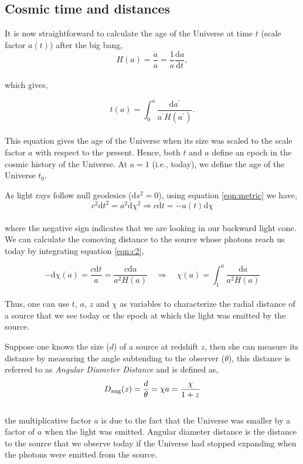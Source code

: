\documentclass[
  11pt,
  twoside,
  openright,
  titlepage,
  headings=optiontoheadandtoc
]{scrbook}
\begin{document}
\subsection{Cosmic time and distances}


It is now straightforward to calculate the age of the Universe at time $t$ 
(scale factor $a(t)$) after the big bang,
\begin{equation}
	H(a) = \dfrac{\dot{a}}{a} = \dfrac{1}{a} \dfrac{\mathrm{d}a}{\mathrm{d}t},
\end{equation}
\\
which gives,

\begin{equation}
	t(a) = \int_0^a \dfrac{\mathrm{d}a^{\prime}}{a^{\prime}H(a^{\prime})}.
\end{equation}
\\
This equation gives the age of the Universe when its size was
scaled to the scale factor $a$ with respect to the present. Hence, both $t$ and
$a$ define an epoch in the cosmic history of the Universe. At $a=1$ (i.e., today),
we define the age of the Universe $t_0$.

As light rays follow null geodesics ($\mathrm{d}s^2=0$), using equation 
\ref{eqn:metric} we have,
\begin{equation}
	c^2\mathrm{d}t^2 = a^2\mathrm{d}\chi^2 \Rightarrow c\mathrm{d}t = -a(t)\mathrm{d}\chi
	\label{eqn:c2}
\end{equation}
\\
where the negative sign indicates that we are looking in our backward light cone. 
We can calculate the comoving distance to the source whose photons reach us
today by integrating equation \ref{eqn:c2},

\begin{equation}
	-\mathrm{d}\chi(a) = \dfrac{c\mathrm{d}t}{a} = 
	 \dfrac{c\mathrm{d}a}{a^2 H(a)} \quad
	 \Rightarrow \quad \chi(a) = \int_1^a \dfrac{\mathrm{d}a}{a^2H(a)}
\end{equation}
\\
Thus, one can use $t$, $a$, $z$ and $\chi$ as variables to characterize the
radial distance of a source that we see today or the epoch at which the light was
emitted by the source. 

Suppose one knows the size ($d$) of a source at redshift $z$, then she can measure its
distance by measuring the angle subtending to the observer ($\theta$), this distance is referred
to as {\it Angular Diameter Distance} and is defined as,
\begin{equation}
	D_{\rm ang}(z) = \dfrac{d}{\theta} = \chi a = \dfrac{\chi}{1+z}
\end{equation}
\\
the multiplicative factor $a$ is due to the fact that the Universe was smaller by 
a factor of $a$ when the light was emitted.  Angular diameter distance 
is the distance to the source that we observe today if the Universe had
stopped expanding when the photons were emitted from the source.
\end{document}
